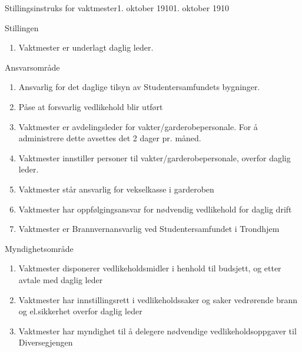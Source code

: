 \begin{instruks}{Stillingsinstruks for vaktmester}{1. oktober 1910}{1. oktober 1910}
    \begin{instruksledd}{Stillingen}
        \begin{enumerate}
            \item Vaktmester er underlagt daglig leder.
        \end{enumerate}    
    \end{instruksledd}

    \begin{instruksledd}{Ansvarsområde}
        \begin{enumerate}
            \item Ansvarlig for det daglige tilsyn av Studentersamfundets bygninger.
            \item Påse at forsvarlig vedlikehold blir utført
            \item Vaktmester er avdelingsleder for vakter/garderobepersonale. For å administrere dette avsettes det 2 dager pr.
                måned.
            \item Vaktmester innstiller personer til vakter/garderobepersonale, overfor daglig leder.
            \item Vaktmester står ansvarlig for vekselkasse i garderoben
            \item Vaktmester har oppfølgingsansvar for nødvendig vedlikehold for daglig drift
            \item Vaktmester er Brannvernansvarlig ved Studentersamfundet i Trondhjem
        \end{enumerate}    
    \end{instruksledd}

    \begin{instruksledd}{Myndighetsområde}
        \begin{enumerate}
            \item Vaktmester disponerer vedlikeholdsmidler i henhold til budsjett, og etter avtale med daglig leder
            \item Vaktmester har innstillingsrett i vedlikeholdssaker og saker vedrørende brann og el.sikkerhet overfor daglig
                leder
            \item Vaktmester har myndighet til å delegere nødvendige vedlikeholdsoppgaver til Diversegjengen
        \end{enumerate}
    \end{instruksledd}


\end{instruks}
